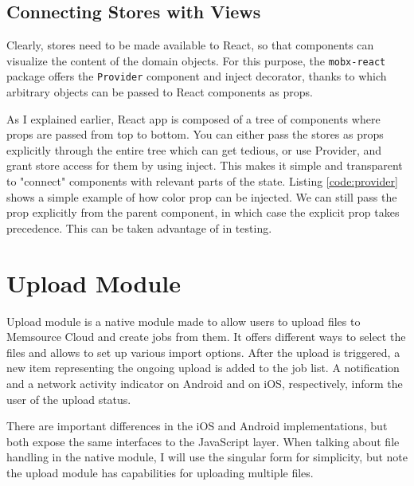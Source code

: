 \subsection{Connecting Stores with Views}

Clearly, stores need to be made available to React, so that components can visualize the content of the domain objects. For this purpose, the \texttt{mobx-react} package offers the \texttt{Provider} component and inject decorator, thanks to which arbitrary objects can be passed to React components as props. 

As I explained earlier, React app is composed of a tree of components where props are passed from top to bottom. You can either pass the stores as props explicitly through the entire tree which can get tedious, or use Provider, and grant store access for them by using inject. This makes it simple and transparent to "connect" components with relevant parts of the state. Listing \ref{code:provider} shows a simple example of how color prop can be injected. We can still pass the prop explicitly from the parent component, in which case the explicit prop takes precedence. This can be taken advantage of in testing.




\section{Upload Module}
Upload module is a native module made to allow users to upload files to Memsource Cloud and create jobs from them. It offers different ways to select the files and allows to set up various import options. After the upload is triggered, a new item representing the ongoing upload is added to the job list. A notification and a network activity indicator on Android and on iOS, respectively, inform the user of the upload status. 

There are important differences in the iOS and Android implementations, but both expose the same interfaces to the JavaScript layer. When talking about file handling in the native module, I will use the singular form for simplicity, but note the upload module has capabilities for uploading multiple files.



